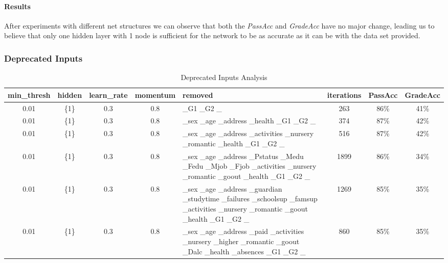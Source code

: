 \documentclass[11pt]{article}
\begin{document}
\paragraph{Results}
After experiments with different net structures we can observe that both the \textit{PassAcc} and \textit{GradeAcc} have no major change, leading us to believe that only one hidden layer with 1 node is sufficient for the network to be as accurate as it can be with the data set provided.

\subsubsection{Deprecated Inputs}
\begin{table}[h]
\begin{tabular}{| c | c | c | c | p{3cm} | c | c | c |}
\hline \textbf{min\_thresh} & \textbf{hidden} & \textbf{learn\_rate} & \textbf{momentum} & \textbf{removed} & \textbf{iterations} & \textbf{PassAcc} & \textbf{GradeAcc}\\
\hline 0.01 & \{1\} & 0.3 & 0.8 & \_G1 \_G2 \_ & 263 & 86\% & 41\%\\
\hline 0.01 & \{1\} & 0.3 & 0.8 & \_sex \_age \_address \_health \_G1 \_G2 \_ & 374 & 87\% & 42\%\\
\hline 0.01 & \{1\} & 0.3 & 0.8 & \_sex \_age \_address \_activities \_nursery \_romantic \_health \_G1 \_G2 \_ & 516 & 87\% & 42\%\\
\hline 0.01 & \{1\} & 0.3 & 0.8 & \_sex \_age \_address \_Pstatus \_Medu \_Fedu \_Mjob \_Fjob \_activities \_nursery \_romantic \_goout \_health \_G1 \_G2 \_ & 1899 & 86\% & 34\%\\
\hline 0.01 & \{1\} & 0.3 & 0.8 & \_sex \_age \_address \_guardian \_studytime \_failures \_schoolsup \_famsup \_activities \_nursery \_romantic \_goout \_health \_G1 \_G2 \_ & 1269 & 85\% & 35\%\\
\hline 0.01 & \{1\} & 0.3 & 0.8 & \_sex \_age \_address \_paid \_activities \_nursery \_higher \_romantic \_goout \_Dalc \_health \_absences \_G1 \_G2 \_ & 860 & 85\% & 35\%\\
\hline
\end{tabular}
\caption{Deprecated Inputs Analysis}
\end{table}
\end{document}
